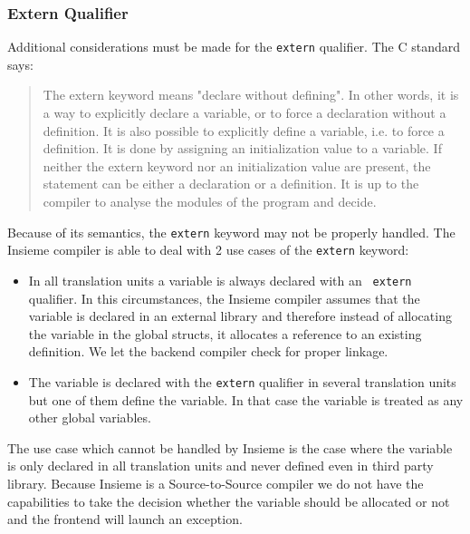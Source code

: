 \subsubsection{Extern Qualifier}

Additional considerations must be made for the {\tt extern} qualifier. The C
standard says:
\begin{quotation}
\small
The extern keyword means "declare without defining". In other words, it is a way
to explicitly declare a variable, or to force a declaration without a
definition. It is also possible to explicitly define a variable, i.e. to force a
definition. It is done by assigning an initialization value to a variable. If
neither the extern keyword nor an initialization value are present, the
statement can be either a declaration or a definition. It is up to the compiler
to analyse the modules of the program and decide. 
\end{quotation}

Because of its semantics, the {\tt extern} keyword may not be properly handled.
The Insieme compiler is able to deal with 2 use cases of the {\tt extern}
keyword:
\begin{itemize}
\item In all translation units a variable is always declared with an {\tt
extern} qualifier. In this circumstances, the Insieme compiler assumes that the
variable is declared in an external library and therefore instead of allocating
the variable in the global structs, it allocates a reference to an existing
definition. We let the backend compiler check for proper linkage. 

\item The variable is declared with the {\tt extern} qualifier in several
translation units but one of them define the variable. In that case the variable
is treated as any other global variables.
\end{itemize}

The use case which cannot be handled by Insieme is the case where the variable
is only declared in all translation units and never defined even in third party
library. Because Insieme is a Source-to-Source compiler we do not have the
capabilities to take the decision whether the variable should be allocated or
not and the frontend will launch an exception.  
